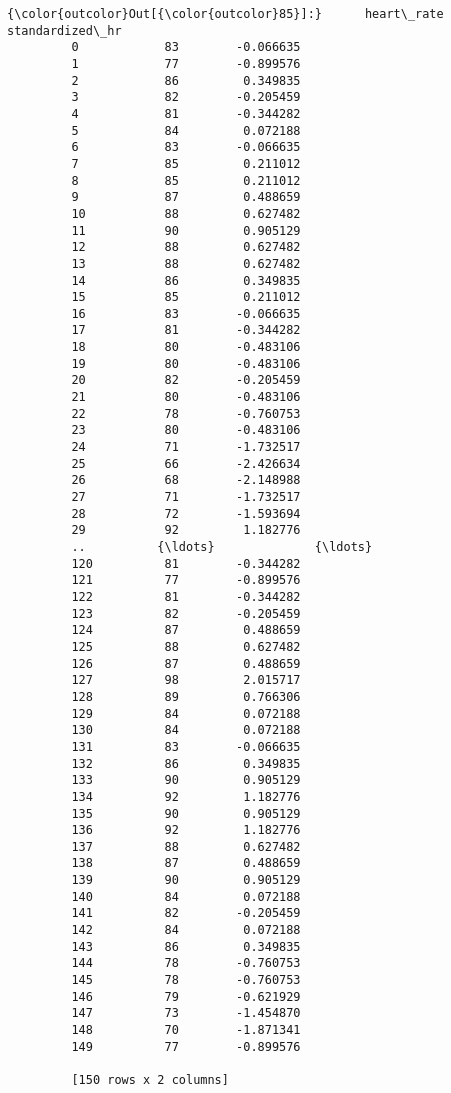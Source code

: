 \documentclass[11pt]{article}
\begin{document}
\begin{Verbatim}[commandchars=\\\{\}]
{\color{outcolor}Out[{\color{outcolor}85}]:}      heart\_rate  standardized\_hr
         0            83        -0.066635
         1            77        -0.899576
         2            86         0.349835
         3            82        -0.205459
         4            81        -0.344282
         5            84         0.072188
         6            83        -0.066635
         7            85         0.211012
         8            85         0.211012
         9            87         0.488659
         10           88         0.627482
         11           90         0.905129
         12           88         0.627482
         13           88         0.627482
         14           86         0.349835
         15           85         0.211012
         16           83        -0.066635
         17           81        -0.344282
         18           80        -0.483106
         19           80        -0.483106
         20           82        -0.205459
         21           80        -0.483106
         22           78        -0.760753
         23           80        -0.483106
         24           71        -1.732517
         25           66        -2.426634
         26           68        -2.148988
         27           71        -1.732517
         28           72        -1.593694
         29           92         1.182776
         ..          {\ldots}              {\ldots}
         120          81        -0.344282
         121          77        -0.899576
         122          81        -0.344282
         123          82        -0.205459
         124          87         0.488659
         125          88         0.627482
         126          87         0.488659
         127          98         2.015717
         128          89         0.766306
         129          84         0.072188
         130          84         0.072188
         131          83        -0.066635
         132          86         0.349835
         133          90         0.905129
         134          92         1.182776
         135          90         0.905129
         136          92         1.182776
         137          88         0.627482
         138          87         0.488659
         139          90         0.905129
         140          84         0.072188
         141          82        -0.205459
         142          84         0.072188
         143          86         0.349835
         144          78        -0.760753
         145          78        -0.760753
         146          79        -0.621929
         147          73        -1.454870
         148          70        -1.871341
         149          77        -0.899576
         
         [150 rows x 2 columns]
\end{Verbatim}
            
\end{document}
